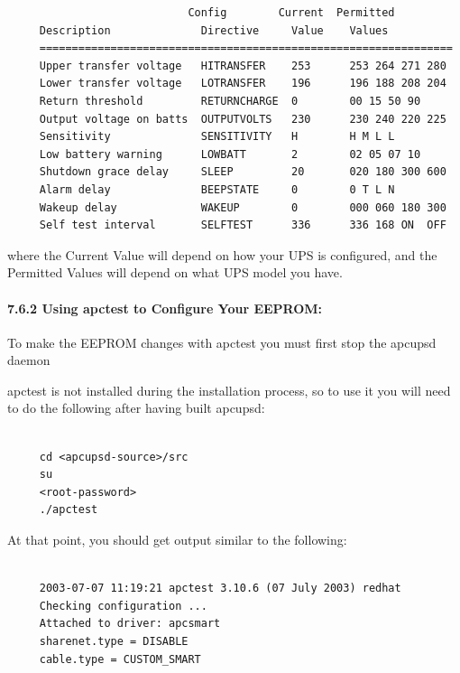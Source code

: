 {{{{{{{{{\begin{verbatim}
                            Config        Current  Permitted
     Description              Directive     Value    Values
     ================================================================
     Upper transfer voltage   HITRANSFER    253      253 264 271 280
     Lower transfer voltage   LOTRANSFER    196      196 188 208 204
     Return threshold         RETURNCHARGE  0        00 15 50 90
     Output voltage on batts  OUTPUTVOLTS   230      230 240 220 225
     Sensitivity              SENSITIVITY   H        H M L L
     Low battery warning      LOWBATT       2        02 05 07 10
     Shutdown grace delay     SLEEP         20       020 180 300 600
     Alarm delay              BEEPSTATE     0        0 T L N
     Wakeup delay             WAKEUP        0        000 060 180 300
     Self test interval       SELFTEST      336      336 168 ON  OFF
\end{verbatim}
\normalsize

where the Current Value will depend on how your UPS is configured, and the
Permitted Values will depend on what UPS model you have. 

\label{Using-apctest-to-Configure-Your-EEPROM}

\paragraph*{7.6.2 Using apctest to Configure Your EEPROM:}

\label{index-eeprom_002c-apctest-142}
\label{index-apctest-setting-eeprom-143}
To make the EEPROM changes with apctest you must first stop the apcupsd daemon
 

apctest is not installed during the installation process, so to use it you
will need to do the following after having built apcupsd: 

\footnotesize
\begin{verbatim}
     
     cd <apcupsd-source>/src
     su
     <root-password>
     ./apctest
\end{verbatim}
\normalsize

At that point, you should get output similar to the following: 

\footnotesize
\begin{verbatim}
     
     2003-07-07 11:19:21 apctest 3.10.6 (07 July 2003) redhat
     Checking configuration ...
     Attached to driver: apcsmart
     sharenet.type = DISABLE
     cable.type = CUSTOM_SMART
     

\end{verbatim}}}}}}}}}}

